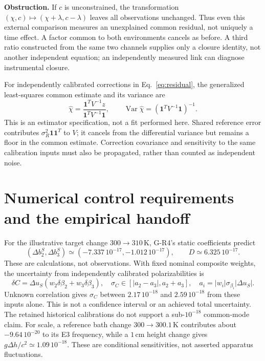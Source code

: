 \documentclass[11pt,a4paper]{article}
\newcommand{\one}{\mathbf 1}
\begin{document}
\textbf{Obstruction.} If $c$ is unconstrained, the transformation
$(\chi,c)\mapsto(\chi+\lambda,c-\lambda)$ leaves all observations
unchanged. Thus even this external comparison measures an unexplained
common residual, not uniquely a time effect. A factor common to both
environments cancels as before. A third ratio constructed from the same
two channels supplies only a closure identity, not another independent
equation; an independently measured link can diagnose instrumental closure.

For independently calibrated corrections in Eq.~\eqref{eq:residual},
the generalized least-squares common estimate and its variance are
\begin{equation}
 \widehat\chi=\frac{\one^TV^{-1}z}{\one^TV^{-1}\one},\qquad
 \operatorname{Var}\widehat\chi=(\one^TV^{-1}\one)^{-1}.
\end{equation}
This is an estimator specification, not a fit performed here. Shared
reference error contributes $\sigma_R^2\one\one^T$ to $V$; it cancels
from the differential variance but remains a floor in the common estimate.
Correction covariance and sensitivity to the same calibration inputs
must also be propagated, rather than counted as independent noise.

\newpage
\section{Numerical control requirements and the empirical handoff}
For the illustrative target change $300\to310\,\mathrm K$, G-R4's
static coefficients predict
\begin{equation}
 (\Delta b_2^S,\Delta b_3^S)\simeq
 (-7.337\,10^{-17},-1.012\,10^{-17}),\qquad
 D\simeq6.325\,10^{-17}.
\end{equation}
These are calculations, not observations. With fixed nominal composite
weights, the uncertainty from independently calibrated polarizabilities is
\begin{equation}
 \delta C=\Delta u_S(w_2\delta\beta_2+w_3\delta\beta_3),\quad
 \sigma_C\in[|a_2-a_3|,a_2+a_3],\quad
 a_i=|w_i|\sigma_{\beta_i}|\Delta u_S|.
\end{equation}
Unknown correlation gives $\sigma_C$ between $2.17\,10^{-18}$ and
$2.59\,10^{-18}$ from these inputs alone. This is not a confidence
interval or an achieved total uncertainty. The retained historical
calibrations do not support a sub-$10^{-18}$ common-mode claim.
For scale, a reference bath change $300\to300.1\,\mathrm K$ contributes
about $-9.64\,10^{-20}$ to its E3 frequency, while a $1\,\mathrm{cm}$
height change gives $g\Delta h/c^2\simeq1.09\,10^{-18}$. These are
conditional sensitivities, not asserted apparatus fluctuations.
\end{document}
